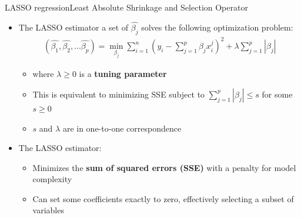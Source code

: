 \documentclass[hyperref={pdfpagelabels=false}]{beamer}
\begin{document}
	\begin{frame}{LASSO regression}{Least Absolute Shrinkage and Selection Operator}
		\begin{itemize}
			
	\item The LASSO estimator a set of $\hat{\beta_{j}}$ solves the following optimization problem:
	\vspace{0.2cm}
	\begin{eqnarray*}
			(\hat{\beta_{1}},\hat{\beta_{2}},...\hat{\beta_{p}})=\min_{\beta_{j}} \sum^{n}_{i=1} (y_{i} - \sum^{p}_{j=1} \beta_{j} x^{j}_{i})^{2} + \lambda \sum^{p}_{j=1} |\beta_{j}|
	\end{eqnarray*}
	
	\begin{itemize}
		\vspace{0.2cm}
		\item where $\lambda \geq 0$ is a \textbf{tuning parameter}
		\vspace{0.2cm}
		\item This is equivalent to minimizing SSE subject to 
$\sum^{p}_{j=1} |\beta_{j}| \leq s$ for some $s \geq 0$ 
		\vspace{0.2cm}

\item $s$ and $\lambda$ are in one-to-one correspondence
        
	\end{itemize}
			\vspace{0.2cm}
	\item The LASSO estimator:
	\begin{itemize}
		\vspace{0.2cm}
		\item Minimizes the \textbf{sum of squared errors (SSE)} with a penalty for model complexity
		\vspace{0.2cm}
		\item Can set some coefficients exactly to zero, effectively selecting a subset of variables
	\end{itemize}

\end{itemize}
\end{frame}
	
	
\end{document}

